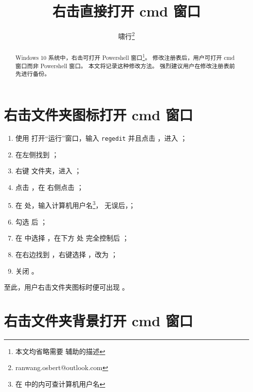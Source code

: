 \documentclass{ctexart}
\title{右击直接打开 \textsf{cmd} 窗口}
\author{啸行\thanks{ranwang.osbert@outlook.com}}
\begin{document}
\maketitle
\begin{abstract}
  Windows 10 系统中，右击可打开 \textsf{Powershell} 窗口\footnote{本文均省略需要 \keys{\shift} 辅助的描述}。
  修改注册表后，用户可打开 \textsf{cmd} 窗口而非 \textsf{Powershell} 窗口。
  本文将记录这种修改方法。
  强烈建议用户在修改注册表前先进行备份。
\end{abstract}

\section{右击文件夹图标打开 \textsf{cmd} 窗口}

\begin{enumerate}
  \item 使用  打开“运行”窗口，输入 \texttt{regedit} 并且点击 ，进入 ；
  \item 在左侧找到 ；
  \item 右键  文件夹，进入 ；
  \item 点击 ，在  右侧点击 ；
  \item 在  处，输入计算机用户名\footnote{在 \keys{\OSwin} 中的内可查计算机用户名}， 无误后，；
  \item 勾选  后 ；
  \item 在  中选择 ，在下方  处  完全控制后 ；
  \item 在右边找到 ，右键选择 ，改为 ；
  \item 关闭 。
\end{enumerate}
至此，用户右击文件夹图标时便可出现 。

\section{右击文件夹背景打开 \textsf{cmd} 窗口}
\end{document}
